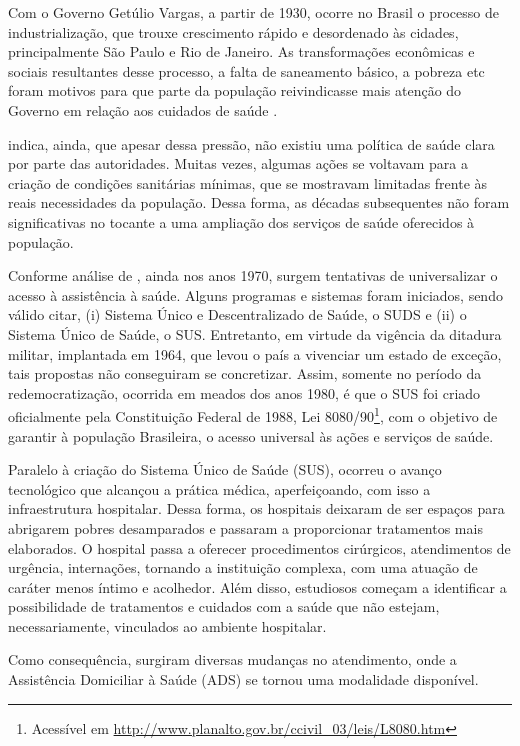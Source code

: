 Com o Governo Getúlio Vargas, a partir de 1930, ocorre no Brasil o processo de
industrialização, que trouxe crescimento rápido e desordenado às cidades,
principalmente São Paulo e Rio de Janeiro. As transformações econômicas e
sociais resultantes desse processo, a falta de saneamento básico, a pobreza etc
foram motivos para que parte da população reivindicasse mais atenção do Governo
em relação aos cuidados de saúde \cite{carvalho1984}.

 indica, ainda, que apesar dessa pressão, não existiu
uma política de saúde clara por parte das autoridades. Muitas vezes, algumas
ações se voltavam para a criação de condições sanitárias mínimas, que se
mostravam limitadas frente às reais necessidades da população. Dessa forma, as
décadas subsequentes não foram significativas no tocante a uma ampliação dos
serviços de saúde oferecidos à população.

Conforme análise de , ainda nos anos 1970, surgem
tentativas de universalizar o acesso à assistência à saúde. Alguns programas e
sistemas foram iniciados, sendo válido citar, (i) Sistema Único e
Descentralizado de Saúde, o SUDS e (ii) o Sistema Único de Saúde, o SUS.
Entretanto, em virtude da vigência da ditadura militar, implantada em 1964, que
levou o país a vivenciar um estado de exceção, tais propostas não conseguiram se
concretizar. Assim, somente no período da redemocratização, ocorrida em meados
dos anos 1980, é que o SUS foi criado oficialmente pela Constituição Federal de
1988, Lei 8080/90\footnote{Acessível em
\url{http://www.planalto.gov.br/ccivil_03/leis/L8080.htm}}, com o  objetivo de
garantir à população Brasileira, o acesso universal às ações e  serviços de
saúde.

Paralelo à criação do Sistema Único de Saúde (SUS), ocorreu o avanço
tecnológico que alcançou a prática médica, aperfeiçoando, com isso a
infraestrutura hospitalar. Dessa forma, os hospitais deixaram de ser espaços
para abrigarem pobres desamparados e passaram a proporcionar tratamentos mais
elaborados. O hospital passa a oferecer  procedimentos cirúrgicos, atendimentos
de urgência, internações, tornando a instituição complexa, com uma atuação de
caráter menos íntimo e acolhedor. Além disso, estudiosos começam a identificar
a possibilidade de tratamentos e cuidados com a  saúde que não estejam,
necessariamente, vinculados ao ambiente hospitalar.

Como consequência, surgiram diversas mudanças no atendimento, onde a Assistência
Domiciliar à Saúde (ADS) se tornou uma modalidade disponível.

